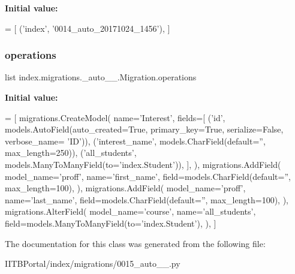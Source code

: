 {\bfseries Initial value\+:}
\begin{DoxyCode}
=  [
        (\textcolor{stringliteral}{'index'}, \textcolor{stringliteral}{'0014\_auto\_20171024\_1456'}),
    ]
\end{DoxyCode}
\mbox{\label{classindex_1_1migrations_1_10015__auto__20171024__1529_1_1Migration_a1a689f002afc4cde1f7b37a46824f356}} 
\subsubsection{\texorpdfstring{operations}{operations}}
{\footnotesize\ttfamily list index.\+migrations.\+\_\+auto\+\_\+\_.\+Migration.\+operations\hspace{0.3cm}{\ttfamily [static]}}

{\bfseries Initial value\+:}
\begin{DoxyCode}
=  [
        migrations.CreateModel(
            name=\textcolor{stringliteral}{'Interest'},
            fields=[
                (\textcolor{stringliteral}{'id'}, models.AutoField(auto\_created=\textcolor{keyword}{True}, primary\_key=\textcolor{keyword}{True}, serialize=\textcolor{keyword}{False}, verbose\_name=\textcolor{stringliteral}{
      'ID'})),
                (\textcolor{stringliteral}{'interest\_name'}, models.CharField(default=\textcolor{stringliteral}{''}, max\_length=250)),
                (\textcolor{stringliteral}{'all\_students'}, models.ManyToManyField(to=\textcolor{stringliteral}{'index.Student'})),
            ],
        ),
        migrations.AddField(
            model\_name=\textcolor{stringliteral}{'proff'},
            name=\textcolor{stringliteral}{'first\_name'},
            field=models.CharField(default=\textcolor{stringliteral}{''}, max\_length=100),
        ),
        migrations.AddField(
            model\_name=\textcolor{stringliteral}{'proff'},
            name=\textcolor{stringliteral}{'last\_name'},
            field=models.CharField(default=\textcolor{stringliteral}{''}, max\_length=100),
        ),
        migrations.AlterField(
            model\_name=\textcolor{stringliteral}{'course'},
            name=\textcolor{stringliteral}{'all\_students'},
            field=models.ManyToManyField(to=\textcolor{stringliteral}{'index.Student'}),
        ),
    ]
\end{DoxyCode}


The documentation for this class was generated from the following file\+:\begin{DoxyCompactItemize}
\item 
I\+I\+T\+B\+Portal/index/migrations/0015\+\_\+auto\+\_\+\_.\+py\end{DoxyCompactItemize}
